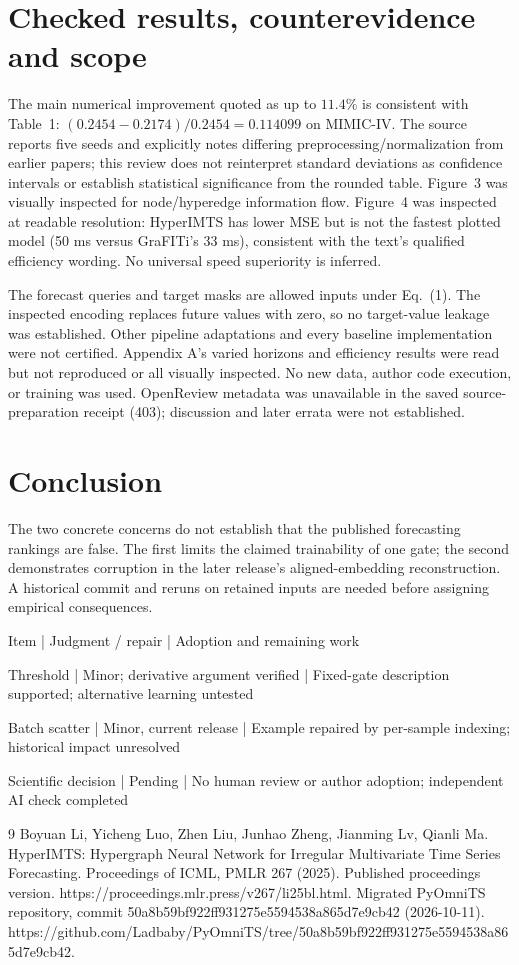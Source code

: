 \documentclass[10pt]{article}
\begin{document}
\section*{Checked results, counterevidence and scope}
The main numerical improvement quoted as up to \(11.4\%\) is consistent with Table 1: \((0.2454-0.2174)/0.2454=0.114099\) on MIMIC-IV. The source reports five seeds and explicitly notes differing preprocessing/normalization from earlier papers; this review does not reinterpret standard deviations as confidence intervals or establish statistical significance from the rounded table. Figure 3 was visually inspected for node/hyperedge information flow. Figure 4 was inspected at readable resolution: HyperIMTS has lower MSE but is not the fastest plotted model (50 ms versus GraFITi’s 33 ms), consistent with the text’s qualified efficiency wording. No universal speed superiority is inferred.\par
The forecast queries and target masks are allowed inputs under Eq. (1). The inspected encoding replaces future values with zero, so no target-value leakage was established. Other pipeline adaptations and every baseline implementation were not certified. Appendix A’s varied horizons and efficiency results were read but not reproduced or all visually inspected. No new data, author code execution, or training was used. OpenReview metadata was unavailable in the saved source-preparation receipt (403); discussion and later errata were not established.\par
\section*{Conclusion}
The two concrete concerns do not establish that the published forecasting rankings are false. The first limits the claimed trainability of one gate; the second demonstrates corruption in the later release’s aligned-embedding reconstruction. A historical commit and reruns on retained inputs are needed before assigning empirical consequences.\par
Item | Judgment / repair | Adoption and remaining work\par
Threshold | Minor; derivative argument verified | Fixed-gate description supported; alternative learning untested\par
Batch scatter | Minor, current release | Example repaired by per-sample indexing; historical impact unresolved\par
Scientific decision | Pending | No human review or author adoption; independent AI check completed\par
9 Boyuan Li, Yicheng Luo, Zhen Liu, Junhao Zheng, Jianming Lv, Qianli Ma. HyperIMTS: Hypergraph Neural Network for Irregular Multivariate Time Series Forecasting. Proceedings of ICML, PMLR 267 (2025). Published proceedings version. https://proceedings.mlr.press/v267/li25bl.html. Migrated PyOmniTS repository, commit 50a8b59bf922ff931275e5594538a865d7e9cb42 (2026-10-11). https://github.com/Ladbaby/PyOmniTS/tree/50a8b59bf922ff931275e5594538a865d7e9cb42.\par
\end{document}
